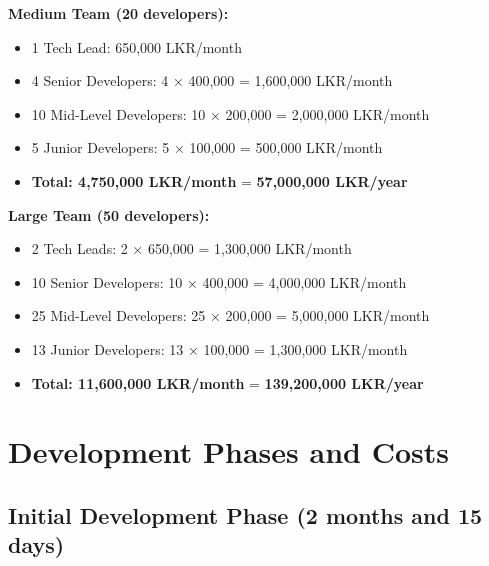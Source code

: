 \documentclass[12pt,a4paper]{article}
\begin{document}
\textbf{Medium Team (20 developers):}
\begin{itemize}
    \item 1 Tech Lead: 650,000 LKR/month
    \item 4 Senior Developers: 4 × 400,000 = 1,600,000 LKR/month
    \item 10 Mid-Level Developers: 10 × 200,000 = 2,000,000 LKR/month
    \item 5 Junior Developers: 5 × 100,000 = 500,000 LKR/month
    \item \textbf{Total: 4,750,000 LKR/month} = \textbf{57,000,000 LKR/year}
\end{itemize}

\textbf{Large Team (50 developers):}
\begin{itemize}
    \item 2 Tech Leads: 2 × 650,000 = 1,300,000 LKR/month
    \item 10 Senior Developers: 10 × 400,000 = 4,000,000 LKR/month
    \item 25 Mid-Level Developers: 25 × 200,000 = 5,000,000 LKR/month
    \item 13 Junior Developers: 13 × 100,000 = 1,300,000 LKR/month
    \item \textbf{Total: 11,600,000 LKR/month} = \textbf{139,200,000 LKR/year}
\end{itemize}

\section{Development Phases and Costs}

\subsection{Initial Development Phase (2 months and 15 days)}
\end{document}
